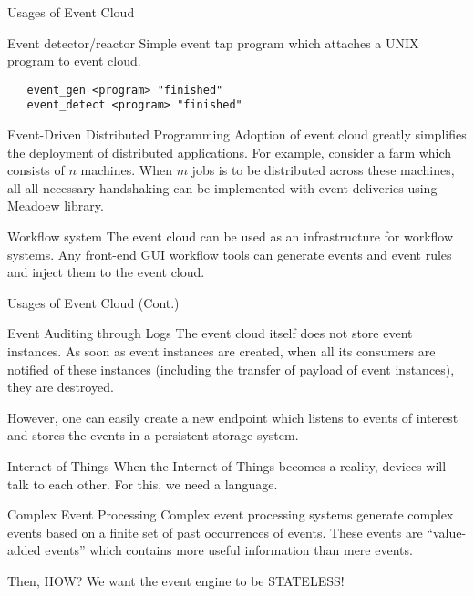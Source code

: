 \documentclass[10pt]{beamer}
\begin{document}
\begin{frame}[fragile]{Usages of Event Cloud}

\begin{block}{Event detector/reactor}
Simple event tap program which attaches a UNIX program to event cloud.
  \begin{verbatim}
   event_gen <program> "finished"
   event_detect <program> "finished"
  \end{verbatim}
\end{block}

\begin{block}{Event-Driven Distributed Programming}
Adoption of event cloud greatly simplifies the deployment of distributed
applications. For example, consider a farm which consists of $n$
machines. When $m$ jobs is to be distributed across these machines, all
all necessary handshaking can be implemented with event deliveries using
Meadoew library. 
\end{block}

\begin{block}{Workflow system}
The event cloud can be used as an infrastructure for workflow systems. Any
front-end GUI workflow tools can generate events and event rules and inject
them to the event cloud. 
\end{block}
\end{frame}

\begin{frame}[fragile]{Usages of Event Cloud (Cont.)}
\begin{block}{Event Auditing through Logs}
The event cloud itself does not store event instances. As soon as event
instances are created, when all its consumers are notified of these instances
(including the transfer of payload of event instances), they are destroyed.

However, one can easily create a new endpoint which listens to events of
interest and stores the events in a persistent storage system.
\end{block}

\begin{block}{Internet of Things}
When the Internet of Things becomes a reality, devices will talk to each
other. For this, we need a language. 
\end{block}

\begin{block}{Complex Event Processing}
Complex event processing systems generate complex events based on a finite set
of past occurrences of events. These events are ``value-added events'' which
contains more useful information than mere events.

Then, HOW? We want the event engine to be STATELESS!
\end{block}

\end{frame}
\end{document}
